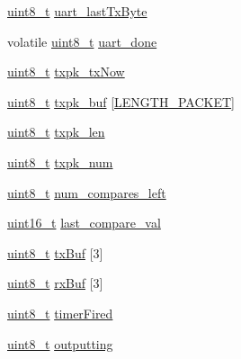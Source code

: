 \begin{DoxyCompactItemize}
\item 
\hyperlink{_p_e___types_8h_aba7bc1797add20fe3efdf37ced1182c5}{uint8\+\_\+t} \hyperlink{structapp__vars__t_a18bdd21f03173b9b53d85c85e0ed7fb3}{uart\+\_\+last\+Tx\+Byte}
\item 
volatile \hyperlink{_p_e___types_8h_aba7bc1797add20fe3efdf37ced1182c5}{uint8\+\_\+t} \hyperlink{structapp__vars__t_a28deb5e77b7d7172218c88720ab45147}{uart\+\_\+done}
\item 
\hyperlink{_p_e___types_8h_aba7bc1797add20fe3efdf37ced1182c5}{uint8\+\_\+t} \hyperlink{structapp__vars__t_a3630f7b330b97185b364a11a7abd8c20}{txpk\+\_\+tx\+Now}
\item 
\hyperlink{_p_e___types_8h_aba7bc1797add20fe3efdf37ced1182c5}{uint8\+\_\+t} \hyperlink{structapp__vars__t_a7f7ce01849624476ca4caa5b9b67499f}{txpk\+\_\+buf} \mbox{[}\hyperlink{samr21__xpro_200std__low__power__mode_200std__low__power__mode_8c_ab23dc632cb92506d08a47330e5869366}{L\+E\+N\+G\+T\+H\+\_\+\+P\+A\+C\+K\+ET}\mbox{]}
\item 
\hyperlink{_p_e___types_8h_aba7bc1797add20fe3efdf37ced1182c5}{uint8\+\_\+t} \hyperlink{structapp__vars__t_acdc3121c80bbb6230df1a1e25bc30880}{txpk\+\_\+len}
\item 
\hyperlink{_p_e___types_8h_aba7bc1797add20fe3efdf37ced1182c5}{uint8\+\_\+t} \hyperlink{structapp__vars__t_a330ab4079f088c7d6ccefdf99e8ec12a}{txpk\+\_\+num}
\item 
\hyperlink{_p_e___types_8h_aba7bc1797add20fe3efdf37ced1182c5}{uint8\+\_\+t} \hyperlink{structapp__vars__t_adce7c091ae691efec1be1dd25ec5939b}{num\+\_\+compares\+\_\+left}
\item 
\hyperlink{_p_e___types_8h_a1f1825b69244eb3ad2c7165ddc99c956}{uint16\+\_\+t} \hyperlink{structapp__vars__t_ad7adbb5401e82444f954f812f699787d}{last\+\_\+compare\+\_\+val}
\item 
\hyperlink{_p_e___types_8h_aba7bc1797add20fe3efdf37ced1182c5}{uint8\+\_\+t} \hyperlink{structapp__vars__t_a304a66d1c86d09156c08f957f8398538}{tx\+Buf} \mbox{[}3\mbox{]}
\item 
\hyperlink{_p_e___types_8h_aba7bc1797add20fe3efdf37ced1182c5}{uint8\+\_\+t} \hyperlink{structapp__vars__t_a8bbd29f28e395393e4fb2a1356351f20}{rx\+Buf} \mbox{[}3\mbox{]}
\item 
\hyperlink{_p_e___types_8h_aba7bc1797add20fe3efdf37ced1182c5}{uint8\+\_\+t} \hyperlink{structapp__vars__t_afbb8540fb4d8c5ba2c0ec44a7b29d6ee}{timer\+Fired}
\item 
\hyperlink{_p_e___types_8h_aba7bc1797add20fe3efdf37ced1182c5}{uint8\+\_\+t} \hyperlink{structapp__vars__t_a32239d1c23c16467c8e4206891b0caa4}{outputting}

\end{DoxyCompactItemize}
